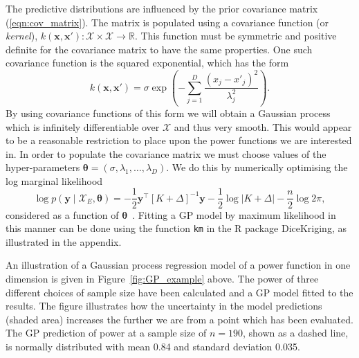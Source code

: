 \documentclass[sagev]{sagej}
\begin{document}
The predictive distributions are influenced by the prior covariance matrix (\ref{eqn:cov_matrix}). The matrix is populated using a covariance function (or \emph{kernel}), $k(\mathbf{x}, \mathbf{x}') : \mathcal{X} \times \mathcal{X} \rightarrow \mathbb{R}$. This function must be symmetric and positive definite for the covariance matrix to have the same properties. One such covariance function is the squared exponential, which has the form
\begin{equation}
k(\mathbf{x}, \mathbf{x}') = \sigma \exp \left( -\sum_{j=1}^{D} \frac{(x_{j} - x'_{j})^2}{\lambda_{j}^2} \right).
\end{equation}
By using covariance functions of this form we will obtain a Gaussian process which is infinitely differentiable over $\mathcal{X}$ and thus very smooth. This would appear to be a reasonable restriction to place upon the power functions we are interested in. In order to populate the covariance matrix we must choose values of the hyper-parameters $\boldsymbol{\theta} = (\sigma, \lambda_{1}, \ldots, \lambda_{D})$. We do this by numerically optimising the log marginal likelihood
\begin{equation}\label{eqn:loglik}
\log{p(\mathbf{y} \mid \mathcal{X}_{E}, \boldsymbol{\theta})} = -\frac{1}{2}\mathbf{y}^\top[K + \Delta]^{-1}\mathbf{y} - \frac{1}{2} \log{|K + \Delta|} - \frac{n}{2} \log{2\pi},
\end{equation}
considered as a function of $\boldsymbol{\theta}$~\cite{Rasmussen2006}. Fitting a GP model by maximum likelihood in this manner can be done using the function \texttt{km} in the R package DiceKriging, as illustrated in the appendix.

An illustration of a Gaussian process regression model of a power function in one dimension is given in Figure~\ref{fig:GP_example} above. The power of three different choices of sample size have been calculated and a GP model fitted to the results. The figure illustrates how the uncertainty in the model predictions (shaded area) increases the further we are from a point which has been evaluated. The GP prediction of power at a sample size of $n = 190$, shown as a dashed line, is normally distributed with mean 0.84 and standard deviation 0.035.
\end{document}
